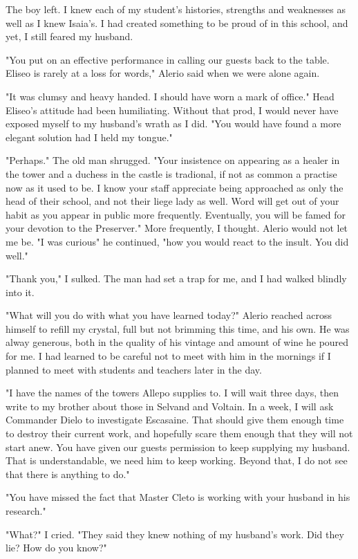 \documentclass{article}
\begin{document}
The boy left. I knew each of my student's histories, strengths and weaknesses as well as I knew Isaia's. I had created something to be proud of in this school, and yet, I still feared my husband.

"You put on an effective performance in calling our guests back to the table. Eliseo is rarely at a loss for words," Alerio said when we were alone again. 

"It was clumsy and heavy handed. I should have worn a mark of office." Head Eliseo's attitude had been humiliating. Without that prod, I would never have exposed myself to my husband's wrath as I did. "You would have found a more elegant solution had I held my tongue."

"Perhaps." The old man shrugged. "Your insistence on appearing as a healer in the tower and a duchess in the castle is tradional, if not as common a practise now as it used to be. I know your staff appreciate being approached as only the head of their school, and not their liege lady as well. Word will get out of your habit as you appear in public more frequently. Eventually, you will be famed for your devotion to the Preserver." More frequently, I thought. Alerio would not let me be. "I was curious" he continued, "how you would react to the insult. You did well."

"Thank you," I sulked. The man had set a trap for me, and I had walked blindly into it.

"What will you do with what you have learned today?" Alerio reached across himself to refill my crystal, full but not brimming this time, and his own. He was alway generous, both in the quality of his vintage and amount of wine he poured for me. I had learned to be careful not to meet with him in the mornings if I planned to meet with students and teachers later in the day.

"I have the names of the towers Allepo supplies to. I will wait three days, then write to my brother about those in Selvand and Voltain. In a week, I will ask Commander Dielo to investigate Escasaine. That should give them enough time to destroy their current work, and hopefully scare them enough that they will not start anew. You have given our guests permission to keep supplying my husband. That is understandable, we need him to keep working. Beyond that, I do not see that there is anything to do."

"You have missed the fact that Master Cleto is working with your husband in his research."

"What?" I cried. "They said they knew nothing of my husband's work. Did they lie? How do you know?"
\end{document}

